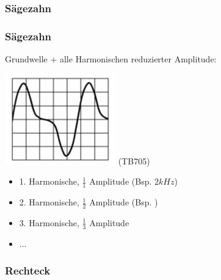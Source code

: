 \subsubsection{Sägezahn}

\begin{frame}
  \frametitle{Sägezahn}

  Grundwelle + alle Harmonischen reduzierter Amplitude:


  \begin{center}
    \includegraphics[width=\textwidth,height=0.5\textheight,keepaspectratio]{a11/TB705.png}
    \tiny (TB705)
  \end{center}

  \begin{itemize}
    \item 1. Harmonische, $\frac{1}{1}$ Amplitude (Bsp. $2kHz$)
    \item 2. Harmonische, $\frac{1}{2}$ Amplitude (Bsp. 
      )
    \item 3. Harmonische, $\frac{1}{3}$ Amplitude
    \item ...
  \end{itemize}

\end{frame}

\subsubsection{Rechteck}

